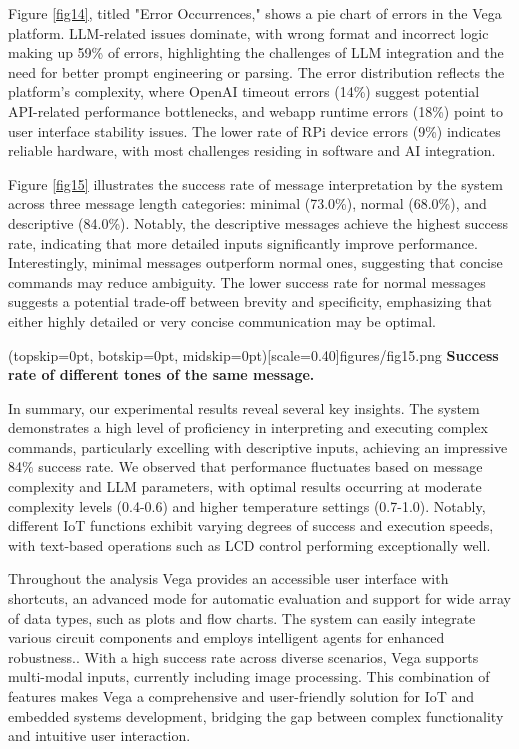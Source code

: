 \documentclass{ieeeaccess}
\begin{document}
Figure \ref{fig14}, titled "Error Occurrences," shows a pie chart of errors in the Vega platform. LLM-related issues dominate, with wrong format and incorrect logic making up 59\% of errors, highlighting the challenges of LLM integration and the need for better prompt engineering or parsing. The error distribution reflects the platform's complexity, where OpenAI timeout errors (14\%) suggest potential API-related performance bottlenecks, and webapp runtime errors (18\%) point to user interface stability issues. The lower rate of RPi device errors (9\%) indicates reliable hardware, with most challenges residing in software and AI integration.

Figure \ref{fig15} illustrates the success rate of message interpretation by the system across three message length categories: minimal (73.0\%), normal (68.0\%), and descriptive (84.0\%). Notably, the descriptive messages achieve the highest success rate, indicating that more detailed inputs significantly improve performance. Interestingly, minimal messages outperform normal ones, suggesting that concise commands may reduce ambiguity. The lower success rate for normal messages suggests a potential trade-off between brevity and specificity, emphasizing that either highly detailed or very concise communication may be optimal. 

\Figure[t!](topskip=0pt, botskip=0pt,
midskip=0pt)[scale=0.40]{{figures/fig15.png}}
{ \textbf{Success rate of different tones of the same message.}\label{fig15}}

In summary, our experimental results reveal several key insights. The system demonstrates a high level of proficiency in interpreting and executing complex commands, particularly excelling with descriptive inputs, achieving an impressive 84\% success rate. We observed that performance fluctuates based on message complexity and LLM parameters, with optimal results occurring at moderate complexity levels (0.4-0.6) and higher temperature settings (0.7-1.0). Notably, different IoT functions exhibit varying degrees of success and execution speeds, with text-based operations such as LCD control performing exceptionally well. 

Throughout the analysis Vega provides an accessible user interface with shortcuts, an advanced mode for automatic evaluation and support for wide array of data types, such as plots and flow charts. The system can easily integrate various circuit components and employs intelligent agents for enhanced robustness.. With a high success rate across diverse scenarios, Vega supports multi-modal inputs, currently including image processing. This combination of features makes Vega a comprehensive and user-friendly solution for IoT and embedded systems development, bridging the gap between complex functionality and intuitive user interaction.
\end{document}
